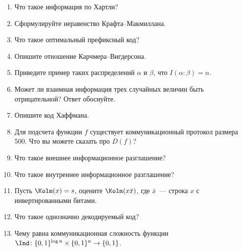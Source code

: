 

\newcommand{\norm}[1]{\left\lVert#1\right\rVert}




\begin{enumerate}
    \item Что такое информация по Хартли?
    \item Сформулируйте неравенство Крафта--Макмиллана.
    \item Что такое оптимальный префиксный код?
    \item Опишите отношение Карчмера--Вигдерсона.
    \item Приведите пример таких распределений $\alpha$ и $\beta$, что $I(\alpha : \beta) = n$.
    \item Может ли взаимная информация трех случайных величин быть отрицательной? Ответ обоснуйте.
    \item Опишите код Хаффмана.        
    \item Для подсчета функции $f$ существует коммуникационный протокол размера $500$. Что вы можете
        сказать про $D(f)$?
    \item Что такое внешнее информационное разглашение?
    \item Что такое внутреннее информационное разглашение?
    \item Пусть $\Kolm(x) = s$, оцените $\Kolm(x \bar{x})$, где $\bar{x}$~--- строка $x$ с
        инвертированными битами.
    \item Что такое однозначно декодируемый код?
    \item Чему равна коммуникационная сложность функции $\Ind\colon \{0, 1\}^{\log n} \times \{0, 1\}^{n}
        \to \{0, 1\}$.
\end{enumerate}



